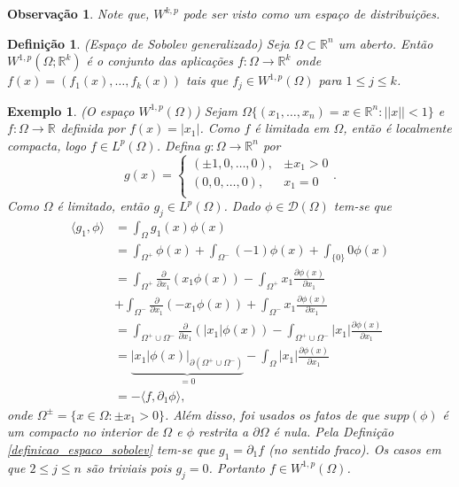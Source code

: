 \documentclass[12pt]{book}
\newtheorem{definicao}[teorema]{Definição}
\newtheorem{exemplo}[teorema]{Exemplo}
\newtheorem{observacao}[teorema]{Observação}
\newcommand{\derivadaparcial}[2]{\frac{\partial #1}{\partial #2}}
\newcommand{\derivadaparcialabrev}[1]{\partial_{#1}}
\newcommand{\espacoLp}[1]{L^{p}(#1)}
\newcommand{\espacosobolev}[1]{W^{1,p}(#1)}
\newcommand{\espacosobolevcontradominio}[2]{W^{1,p}(#1;#2)}
\newcommand{\espacosobolevgeral}[2]{W^{1,#1}(#2)}
\newcommand{\funcaocond}[5]{
	#1 = 
	\left\{
	\begin{array}{cc}
		#2, & #3\\
		#4, & #5\\
	\end{array}
	\right.
}
\newcommand{\funcoesteste}{\mathcal{D}(\Omega)}
\newcommand{\norma}[1]{||#1||}
\newcommand{\produtointerno}[2]{\langle #1, #2 \rangle}
\newcommand{\real}[1]{\mathbb{R}^{#1}}
\newcommand{\reta}{\real{}}
\begin{document}
	\begin{observacao}\label{observacao_espacos_sobolev_distribuicao}
		Note que, $W^{k,p}$ pode ser visto como um espaço de distribuições.
	\end{observacao}
	
	\begin{definicao}\label{definicao_espalo_sobolev_generalizado}
		(Espaço de Sobolev generalizado) Seja $\Omega\subset \real{n}$ um aberto. Então $\espacosobolevcontradominio{\Omega}{\real{k}}$ é o conjunto das aplicações  $f:\Omega \to \real{k}$ onde $f(x) = (f_{1}(x), \dots, f_{k}(x))$ tais que $f_{j} \in \espacosobolev{\Omega} $ para $1\leq j \leq k$.
	\end{definicao}
	
	\begin{exemplo}
		(O espaço $\espacosobolevgeral{p}{\Omega}$) Sejam $\Omega \{(x_{1}, \dots, x_{n})=x \in \real{n}: \norma{x}<1 \}$ e $f:\Omega\to \reta$ definida por $f(x) = |x_{1}|$. Como $f$ é limitada em $\Omega$, então é localmente compacta, logo $f \in \espacoLp{\Omega}$. Defina $g:\Omega\to \real{n}$ por
		$$
		\funcaocond{g(x)}{(\pm 1, 0, \dots, 0)}{\pm x_{1}>0}{(0, 0, \dots, 0)}{x_{1} = 0}.
		$$
		Como $\Omega$ é limitado, então $g_{j}\in \espacoLp{\Omega}$. Dado $\phi \in \funcoesteste$ tem-se que
		$$
		\begin{aligned}
		\produtointerno{g_{1}}{\phi} 
		&= \int_{\Omega}g_{1}(x)\phi(x)
		\\
		&=\int_{\Omega^{+}}\phi(x)+\int_{\Omega^{-}}(-1)\phi(x)+\int_{\{0\}}0\phi(x)
		\\ &=\int_{\Omega^{+}}\derivadaparcial{}{x_{1}}(x_{1}\phi(x)) - \int_{\Omega^{+}}x_{1}\derivadaparcial{\phi(x)}{x_{1}}
		\\
		&+\int_{\Omega^{-}}\derivadaparcial{}{x_{1}}(-x_{1}\phi(x)) + \int_{\Omega^{-}}x_{1}\derivadaparcial{\phi(x)}{x_{1}}
		\\ 
		&=
		\int_{\Omega^{+}\cup \Omega^{-}}\derivadaparcial{}{x_{1}}(|x_{1}|\phi(x)) - \int_{\Omega^{+}\cup \Omega^{-}}|x_{1}|\derivadaparcial{\phi(x)}{x_{1}}
		\\
		&=
		\underbrace{|x_{1}|\phi(x)\Big|_{\partial(\Omega^{+}\cup \Omega^{-})}}_{=0} - \int_{\Omega}|x_{1}|\derivadaparcial{\phi(x)}{x_{1}}
		\\
		&=
		-\produtointerno{f}{\derivadaparcialabrev{1}\phi},
		\end{aligned}
		$$
		onde $\Omega^{\pm} = \{x \in \Omega: \pm x_{1} >0\}$. Além disso, foi usados os fatos de que $supp(\phi) $ é um compacto no interior de $\Omega$ e $\phi$ restrita a $\partial \Omega$ é nula. Pela Definição \ref{definicao_espaco_sobolev} tem-se que $g_{1} = \derivadaparcialabrev{1}f$ (no sentido fraco). Os casos em que $2\leq j\leq n$ são triviais pois $g_{j} = 0$. Portanto $f\in \espacosobolev{\Omega}$.
	\end{exemplo}
	
\end{document}
